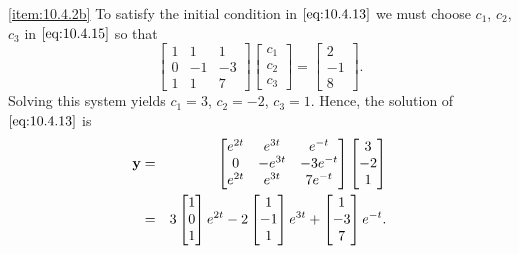 \documentclass{ximera}
\begin{document}
\begin{example}
\begin{explanation}
\ref{item:10.4.2b}
 To satisfy the initial condition in  $\eqref{eq:10.4.13}$ we must choose
$c_1$, $c_2$, $c_3$ in  $\eqref{eq:10.4.15}$ so that
$$
\begin{bmatrix}1&1&1\\0&-1&-3\\
1&1&7\end{bmatrix}
\begin{bmatrix} c_1\\c_2\\c_3\end{bmatrix}=
\begin{bmatrix}2\\-1\\8\end{bmatrix}.
$$
Solving this system yields $c_1=3$, $c_2=-2$, $c_3=1$.  Hence, the solution
of  $\eqref{eq:10.4.13}$ is
\begin{eqnarray*}
{\bf y}&=&\begin{bmatrix}e^{2t}&e^{3t}&
e^{-t}\\0&-e^{3t}
&-3e^{-t}\\e^{2t}&e^{3t}&7e^{-t}\end{bmatrix}
\begin{bmatrix}3\\-2\\1\end{bmatrix}\\
&=&3\begin{bmatrix}1\\0\\1\end{bmatrix}e^{2t}-2
\begin{bmatrix}1\\-1\\1\end{bmatrix}
e^{3t}+\begin{bmatrix}1\\-3\\7\end{bmatrix}e^{-t}.
\end{eqnarray*}
\end{explanation}
\end{example}
\end{document}
